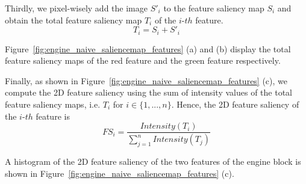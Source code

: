 Thirdly, we pixel-wisely add the image $ S'_{i} $ to the feature saliency map $ S_{i} $ and obtain the total feature saliency map $ T_{i} $ of the $i$-$th$ feature.
\[ T_{i} =S_{i}+S'_{i}\]

Figure~\ref{fig:engine_naive_saliencemap_features} (a) and (b) display the total feature saliency maps of the red feature and the green feature respectively.

Finally, as shown in Figure~\ref{fig:engine_naive_saliencemap_features} (c), we compute the 2D feature saliency using the sum of intensity values of the total feature saliency maps, i.e. $ T_{i}$ for $ i \in \{1, ... ,n\} $.
Hence, the 2D feature saliency of the $i$-$th$  feature is
\[ FS_{i}=\frac{Intensity(T_{i})}{ \sum_{j=1}^{n} Intensity(T_{j}) } \]

A histogram of the 2D feature saliency of the two features of the engine block is shown in Figure~\ref{fig:engine_naive_saliencemap_features} (c).

